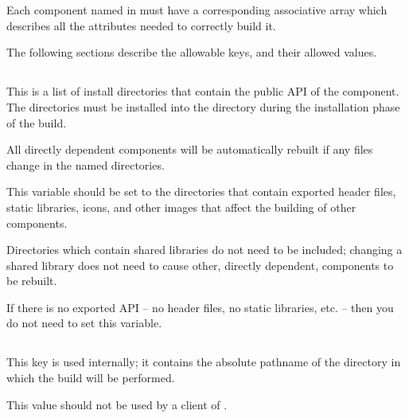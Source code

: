 \section{}

Each component named in \lmsbwcomponents must have a corresponding
associative array which describes all the attributes needed to
correctly build it.

The following sections describe the allowable keys, and their allowed
values.

\subsection{}\label{variables:api}

This is a list of install directories that contain the public API of
the component.  The directories must be installed into the \destdir
directory during the installation phase of the build.

All directly dependent components will be automatically rebuilt if any
files change in the named directories.

This variable should be set to the directories that contain exported
header files, static libraries, icons, and other images that affect
the building of other components.

Directories which contain shared libraries do not need to be included;
changing a shared library does not need to cause other, directly
dependent, components to be rebuilt.

If there is no exported API -- no header files, no static libraries,
etc. -- then you do not need to set this variable.


\subsection{}\label{variables:build-directory}

This key is used internally; it contains the absolute pathname of the
directory in which the build will be performed.

This value should not be used by a client of \lmsbw.


\subsection{}\label{variables:build-log}

